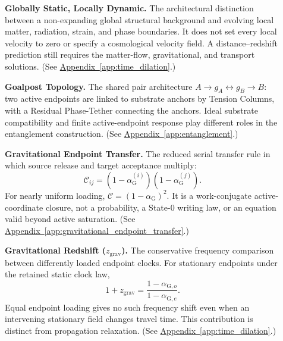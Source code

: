 \begin{description}
\item[] \begin{minipage}[t]{\linewidth}
\textbf{Globally Static, Locally Dynamic.} The architectural distinction between a non-expanding global structural background and evolving local matter, radiation, strain, and phase boundaries. It does not set every local velocity to zero or specify a cosmological velocity field. A distance--redshift prediction still requires the matter-flow, gravitational, and transport solutions.
(See \hyperref[app:time_dilation]{Appendix~\ref*{app:time_dilation}}.)
\end{minipage}

\item[] \begin{minipage}[t]{\linewidth}
\textbf{Goalpost Topology.} The shared pair architecture $A\to g_A\leftrightarrow g_B\to B$: two active endpoints are linked to substrate anchors by Tension Columns, with a Residual Phase-Tether connecting the anchors. Ideal substrate compatibility and finite active-endpoint response play different roles in the entanglement construction.
(See \hyperref[app:entanglement]{Appendix~\ref*{app:entanglement}}.)
\end{minipage}

\item[] \begin{minipage}[t]{\linewidth}
\textbf{Gravitational Endpoint Transfer.} The reduced serial transfer rule in which source release and target acceptance multiply:
\[
 \mathcal C_{ij}
 =(1-\alpha_{\mathrm G}^{(i)})(1-\alpha_{\mathrm G}^{(j)}).
\]
For nearly uniform loading, $\mathcal C=(1-\alpha_{\mathrm G})^2$. It is a work-conjugate active-coordinate closure, not a probability, a State-0 writing law, or an equation valid beyond active saturation.
(See \hyperref[app:gravitational_endpoint_transfer]{Appendix~\ref*{app:gravitational_endpoint_transfer}}.)
\end{minipage}

\item[] \begin{minipage}[t]{\linewidth}
\textbf{Gravitational Redshift ($z_{\mathrm{grav}}$).} The conservative frequency comparison between differently loaded endpoint clocks. For stationary endpoints under the retained static clock law,
\[
 1+z_{\mathrm{grav}}
 =\frac{1-\alpha_{\mathrm G,o}}{1-\alpha_{\mathrm G,e}}.
\]
Equal endpoint loading gives no such frequency shift even when an intervening stationary field changes travel time. This contribution is distinct from propagation relaxation.
(See \hyperref[app:time_dilation]{Appendix~\ref*{app:time_dilation}}.)
\end{minipage}


\end{description}
